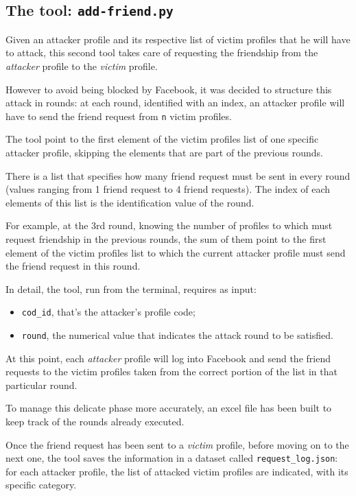 \subsection{The tool: \texttt{add-friend.py}}
Given an attacker profile and its respective list of victim profiles that he will have to attack, this second tool takes care of requesting the friendship from the \textit{attacker} profile to the \textit{victim} profile.\par \noindent 
However to avoid being blocked by Facebook, it was decided to structure this attack in rounds: at each round, identified with an index, an attacker profile will have to send the friend request from \texttt{n} victim profiles.\par \noindent 
The tool point to the first element of the victim profiles list of one specific attacker profile, skipping the elements that are part of the previous rounds.
\par \noindent There is a list that specifies how many friend request must be sent in every round (values ranging from 1 friend request to 4 friend requests). The index of each elements of this list is the identification value of the round.\par \noindent 
For example, at the 3rd round, knowing the number of profiles to which must request friendship in the previous rounds, the sum of them point to the first element of the victim profiles list to which the current attacker profile must send the friend request in this round.
\par \noindent In detail, the tool, run from the terminal, requires as input:
\begin{itemize}
	\item \texttt{cod\_id}, that's the attacker's profile code;
	\item \texttt{round}, the numerical value that indicates the attack round to be satisfied.
\end{itemize}
At this point, each \textit{attacker} profile will log into Facebook and send the friend requests to the victim profiles taken from the correct portion of the list in that particular round. \par \noindent 
To manage this delicate phase more accurately, an excel file has been built to keep track of the rounds already executed.
\par \noindent Once the friend request has been sent to a \textit{victim} profile, before moving on to the next one, the tool saves the information in a dataset called \texttt{request\_log.json}: for each attacker profile, the list of attacked victim profiles are indicated, with its specific category.